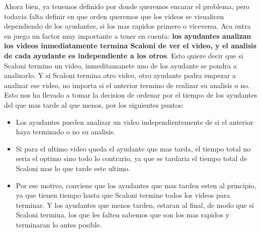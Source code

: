 Ahora bien, ya tenemos definido por donde queremos encarar el problema, pero todavia falta definir en que orden queremos que los videos se visualicen dependiendo de los ayudantes, si los mas rapidos primero o viceversa. Aca entra en juego un factor muy importante a tener en cuenta: \textbf{los ayudantes analizan los videos inmediatamente termina Scaloni de ver el video, y el analisis de cada ayudante es independiente a los otros}. Esto quiere decir que si Scaloni termino un video, inmeditamanete uno de los ayudante se pondra a analizarlo. Y si Scaloni termina otro video, otro ayudante podra empezar a analizar ese video, no importa si el anterior termino de realizar su analisis o no. Esto nos ha llevado a tomar la decision de ordenar por el tiempo de los ayudantes del que mas tarde al que menos, por los siguientes puntos:
\begin{itemize}
    \item Los ayudantes pueden analizar un video independientemente de si el anterior haya terminado o no su analisis.
    \item Si para el ultimo video queda el ayudante que mas tarda, el tiempo total no seria el optimo sino todo lo contrario, ya que se tardaria el tiempo total de Scaloni mas lo que tarde este ultimo.
    \item Por ese motivo, conviene que los ayudantes que mas tarden esten al principio, ya que tienen tiempo hasta que Scaloni termine todos los videos para terminar. Y los ayudantes que menos tarden, estaran al final, de modo que si Scaloni termina, los que les falten sabemos que son los mas rapidos y terminaran lo antes posible.
\end{itemize}